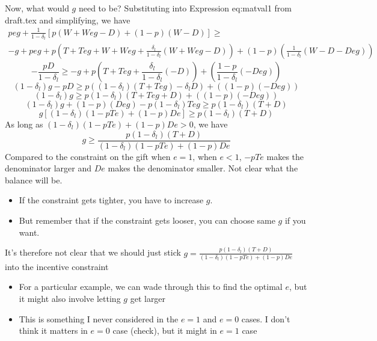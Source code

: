 \documentclass[12pt]{article}
\newcommand{\de}{\delta}
\begin{document}
Now, what would $g$ need to be?
Substituting into Expression eq:matval1 from draft.tex and simplifying, we have
\begin{multline*}
	peg + \frac{1}{1-\de_l}\left[p(W+Weg-D) + (1-p)(W-D) \right] \geq \\
-g + peg + p\left(T + Teg +W + Weg + \frac{\de_l}{1-\de_l}\left(W + Weg-D \right) \right) + (1-p)\left( \frac{1}{1-\de_l}\left(W-D-Deg \right) \right)
\end{multline*}
\begin{equation*}
	-\frac{pD}{1-\de_l} \geq -g + p\left(T + Teg +\frac{\de_l}{1-\de_l}\left(-D \right) \right) + \left( \frac{1-p}{1-\de_l}\left(-Deg \right) \right)
\end{equation*}
\begin{equation*}
	(1-\de_l) g-pD \geq p\left((1-\de_l)(T + Teg) -\de_l D \right) + \left( (1-p)\left(-Deg \right) \right)
\end{equation*}
\begin{equation*}
	(1-\de_l) g\geq p(1-\de_l)(T + Teg+D) + \left( (1-p)\left(-Deg \right) \right)
\end{equation*}
\begin{equation*}
	(1-\de_l) g + (1-p)\left(Deg \right)-p(1-\de_l)Teg\geq p(1-\de_l)(T +D) 
\end{equation*}
\begin{equation*}
	g \left[(1-\de_l)(1-pTe) + (1-p)De \right]\geq p(1-\de_l)(T +D) 
\end{equation*}
As long as $(1-\de_l)(1-pTe) + (1-p)De>0$, we have
\begin{equation*}
	g \geq \frac{p(1-\de_l)(T +D) }{(1-\de_l)(1-pTe) + (1-p)De}
\end{equation*}
Compared to the constraint on the gift when $e=1$, when $e<1$, $-pTe$ makes the denominator larger and $De$ makes the denominator smaller. Not clear what the balance will be.
\begin{itemize}
	\item If the constraint gets tighter, you have to increase $g$.
	\item But remember that if the constraint gets looser, you can choose same $g$ if you want.
\end{itemize}
It's therefore not clear that we should just stick $g = \frac{p(1-\de_l)(T +D) }{(1-\de_l)(1-pTe) + (1-p)De}$ into the incentive constraint
\begin{itemize}
	\item For a particular example, we can wade through this to find the optimal $e$, but it might also involve letting $g$ get larger
	\item This is something I never considered in the $e=1$ and $e=0$ cases. I don't think it matters in $e=0$ case (check), but it might in $e=1$ case 
\end{itemize}
\end{document}
